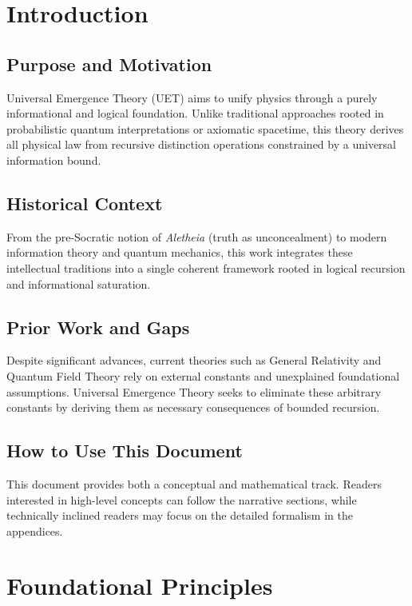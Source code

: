 \documentclass[12pt,a4paper]{article}
\begin{document}
\section{Introduction}

\subsection{Purpose and Motivation}

Universal Emergence Theory (UET) aims to unify physics through a purely informational and logical foundation. Unlike traditional approaches rooted in probabilistic quantum interpretations or axiomatic spacetime, this theory derives all physical law from recursive distinction operations constrained by a universal information bound.

\subsection{Historical Context}

From the pre-Socratic notion of \textit{Aletheia} (truth as unconcealment) to modern information theory and quantum mechanics, this work integrates these intellectual traditions into a single coherent framework rooted in logical recursion and informational saturation.

\subsection{Prior Work and Gaps}

Despite significant advances, current theories such as General Relativity and Quantum Field Theory rely on external constants and unexplained foundational assumptions. Universal Emergence Theory seeks to eliminate these arbitrary constants by deriving them as necessary consequences of bounded recursion.

\subsection{How to Use This Document}

This document provides both a conceptual and mathematical track. Readers interested in high-level concepts can follow the narrative sections, while technically inclined readers may focus on the detailed formalism in the appendices.

\section{Foundational Principles}
\end{document}
